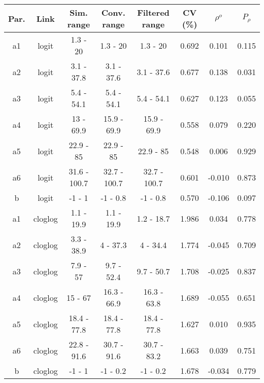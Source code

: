 
\begin{tabular}{cccccccc}
\toprule
Par. & Link & Sim. range & Conv. range & Filtered range & CV (\%) & $\rho^{o}$ & $P_\rho$\\
\midrule
a1 & logit & 1.3 - 20 & 1.3 - 20 & 1.3 - 20 & 0.692 & 0.101 & 0.115\\
a2 & logit & 3.1 - 37.8 & 3.1 - 37.6 & 3.1 - 37.6 & 0.677 & 0.138 & 0.031\\
a3 & logit & 5.4 - 54.1 & 5.4 - 54.1 & 5.4 - 54.1 & 0.627 & 0.123 & 0.055\\
a4 & logit & 13 - 69.9 & 15.9 - 69.9 & 15.9 - 69.9 & 0.558 & 0.079 & 0.220\\
a5 & logit & 22.9 - 85 & 22.9 - 85 & 22.9 - 85 & 0.548 & 0.006 & 0.929\\
a6 & logit & 31.6 - 100.7 & 32.7 - 100.7 & 32.7 - 100.7 & 0.601 & -0.010 & 0.873\\
b & logit & -1 - 1 & -1 - 0.8 & -1 - 0.8 & 0.570 & -0.106 & 0.097\\
\addlinespace
a1 & cloglog & 1.1 - 19.9 & 1.1 - 19.9 & 1.2 - 18.7 & 1.986 & 0.034 & 0.778\\
a2 & cloglog & 3.3 - 38.9 & 4 - 37.3 & 4 - 34.4 & 1.774 & -0.045 & 0.709\\
a3 & cloglog & 7.9 - 57 & 9.7 - 52.4 & 9.7 - 50.7 & 1.708 & -0.025 & 0.837\\
a4 & cloglog & 15 - 67 & 16.3 - 66.9 & 16.3 - 63.8 & 1.689 & -0.055 & 0.651\\
a5 & cloglog & 18.4 - 77.8 & 18.4 - 77.8 & 18.4 - 77.8 & 1.627 & 0.010 & 0.935\\
a6 & cloglog & 22.8 - 91.6 & 30.7 - 91.6 & 30.7 - 83.2 & 1.663 & 0.039 & 0.751\\
b & cloglog & -1 - 1 & -1 - 0.2 & -1 - 0.2 & 1.678 & -0.034 & 0.779\\
\bottomrule
\end{tabular}